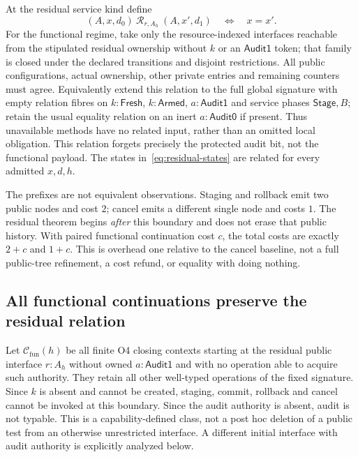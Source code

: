 \documentclass[11pt,a4paper]{article}
\theoremstyle{definition}
\begin{document}
At the residual service kind define
\begin{equation}\label{eq:residual-relation}
 (A,x,d_0)\ \mathcal R_{r,A_h}\ (A,x',d_1)
       \quad\Longleftrightarrow\quad x=x'.
\end{equation}
For the functional regime, take only the resource-indexed interfaces
reachable from the stipulated residual ownership without $k$ or an
$\mathsf{Audit1}$ token; that family is closed under the declared
transitions and disjoint restrictions. All public configurations,
actual ownership, other private entries and remaining counters must agree.
Equivalently extend this relation to the full global signature with empty
relation fibres on $k:\mathsf{Fresh}$, $k:\mathsf{Armed}$,
$a:\mathsf{Audit1}$ and service phases $\mathsf{Stage},B$; retain the
usual equality relation on an inert $a:\mathsf{Audit0}$ if present.
Thus unavailable methods have no related input, rather than an omitted
local obligation. This relation forgets precisely the
protected audit bit, not the functional payload. The states
in~\eqref{eq:residual-states} are related for every admitted $x,d,h$.

The prefixes are not equivalent observations. Staging and rollback emit
two public nodes and cost $2$; cancel emits a different single node and
costs $1$. The residual theorem begins \emph{after} this boundary and
does not erase that public history. With paired functional continuation
cost $c$, the total costs are exactly $2+c$ and $1+c$. This is overhead
one relative to the cancel baseline, not a full public-tree refinement,
a cost refund, or equality with doing nothing.

\subsection{All functional continuations preserve the residual relation}
Let $\mathcal C_{\mathrm{fun}}(h)$ be all finite O4 closing contexts
starting at the residual public interface $r:A_h$ without owned
$a:\mathsf{Audit1}$ and with no operation able to acquire such authority.
They retain all other well-typed operations of the fixed signature.
Since $k$ is absent and cannot be created, staging, commit, rollback and
cancel cannot be invoked at this boundary. Since the audit authority is
absent, audit is not typable. This is a capability-defined class, not a
post hoc deletion of a public test from an otherwise unrestricted
interface. A different initial interface with audit authority is
explicitly analyzed below.
\end{document}
